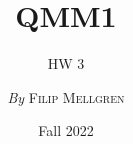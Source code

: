 

\title{QMM1}
\subtitle{HW 3}

\author{\textit{By} \textsc{Filip Mellgren}}
\date{Fall 2022}


	
	\maketitle
	
	
	
	

